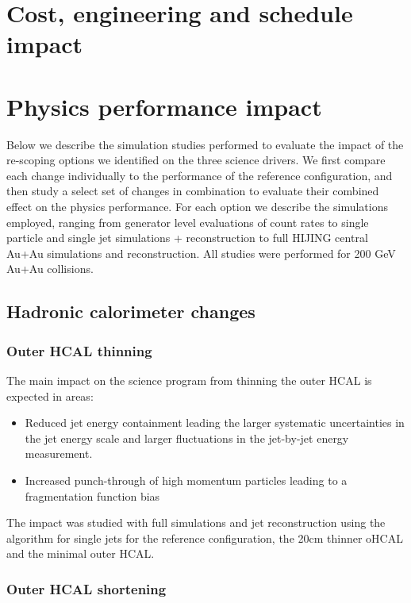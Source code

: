 
\chapter{Cost, engineering and schedule impact}
\label{cha:engineering}









\chapter{Physics performance impact}
\label{cha:performance}

Below we describe the simulation studies performed to evaluate the impact of the re-scoping options we identified on the three 
science drivers. We  first compare each change individually to the performance of the reference configuration, and then study
a select set of changes in combination to evaluate their combined effect on the physics performance. For each option we 
describe the simulations employed, ranging from generator level evaluations of count rates to single particle and single jet
\geant simulations + reconstruction to full HIJING central Au+Au \geant simulations and reconstruction. All studies were 
performed for 200 GeV Au+Au collisions.
\section{Hadronic calorimeter changes}
\subsection{Outer HCAL thinning}
The main impact on the science program from thinning the outer HCAL is expected in areas:
\begin{itemize} 
\item Reduced jet energy containment leading the larger systematic uncertainties in the jet energy scale and larger fluctuations
in the jet-by-jet energy measurement.
\item Increased punch-through of high momentum particles leading to a fragmentation function bias
\end{itemize}
The impact was studied with full \geant simulations and jet reconstruction using the \antikt algorithm for single jets 
for the reference configuration, the 20cm thinner oHCAL and the minimal outer HCAL. 
\subsection{Outer HCAL shortening}

